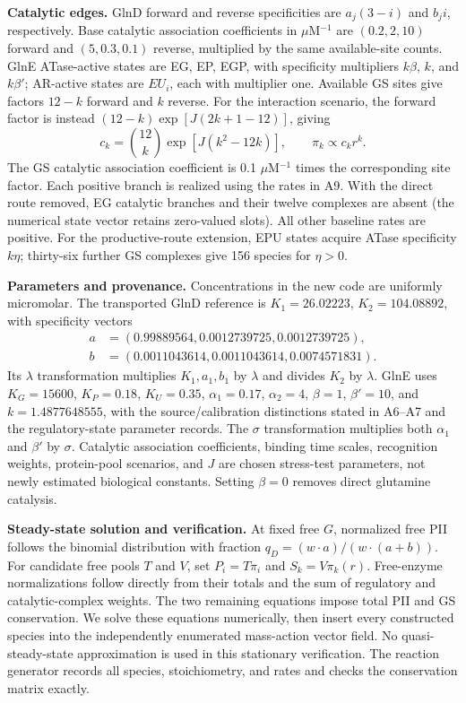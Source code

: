 \documentclass[11pt]{article}
\begin{document}
\textbf{Catalytic edges.} GlnD forward and reverse specificities are $a_j(3-i)$ and $b_ji$, respectively. Base catalytic association coefficients in $\mu$M$^{-1}$ are $(0.2,2,10)$ forward and $(5,0.3,0.1)$ reverse, multiplied by the same available-site counts. GlnE ATase-active states are EG, EP, EGP, with specificity multipliers $k\beta$, $k$, and $k\beta'$; AR-active states are $EU_i$, each with multiplier one. Available GS sites give factors $12-k$ forward and $k$ reverse. For the interaction scenario, the forward factor is instead $(12-k)\exp[J(2k+1-12)]$, giving
\[
 c_k={12\choose k}\exp[J(k^2-12k)],\qquad \pi_k\propto c_kr^k.
\]
The GS catalytic association coefficient is 0.1 $\mu$M$^{-1}$ times the corresponding site factor. Each positive branch is realized using the rates in A9. With the direct route removed, EG catalytic branches and their twelve complexes are absent (the numerical state vector retains zero-valued slots). All other baseline rates are positive. For the productive-route extension, EPU states acquire ATase specificity $k\eta$; thirty-six further GS complexes give 156 species for $\eta>0$.

\textbf{Parameters and provenance.} Concentrations in the new code are uniformly micromolar. The transported GlnD reference is $K_1=26.02223$, $K_2=104.08892$, with specificity vectors
\[\begin{aligned}
 a&=(0.99889564,0.0012739725,0.0012739725),\\
 b&=(0.0011043614,0.0011043614,0.0074571831).
\end{aligned}\]
 Its $\lambda$ transformation multiplies $K_1,a_1,b_1$ by $\lambda$ and divides $K_2$ by $\lambda$. GlnE uses $K_G=15600$, $K_P=0.18$, $K_U=0.35$, $\alpha_1=0.17$, $\alpha_2=4$, $\beta=1$, $\beta'=10$, and $k=1.4877648555$, with the source/calibration distinctions stated in A6--A7 and the regulatory-state parameter records. The $\sigma$ transformation multiplies both $\alpha_1$ and $\beta'$ by $\sigma$. Catalytic association coefficients, binding time scales, recognition weights, protein-pool scenarios, and $J$ are chosen stress-test parameters, not newly estimated biological constants. Setting $\beta=0$ removes direct glutamine catalysis.

\textbf{Steady-state solution and verification.} At fixed free $G$, normalized free PII follows the binomial distribution with fraction $q_D=(w\cdot a)/(w\cdot(a+b))$. For candidate free pools $T$ and $V$, set $P_i=T\pi_i$ and $S_k=V\pi_k(r)$. Free-enzyme normalizations follow directly from their totals and the sum of regulatory and catalytic-complex weights. The two remaining equations impose total PII and GS conservation. We solve these equations numerically, then insert every constructed species into the independently enumerated mass-action vector field. No quasi-steady-state approximation is used in this stationary verification. The reaction generator records all species, stoichiometry, and rates and checks the conservation matrix exactly.
\end{document}
